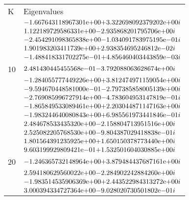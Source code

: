 \begin{figure}[!tbh]
 \centering    
\begin{tabular}{ |p{1cm}|| p{10cm}|}
\hline
 K & Eigenvalues \\ \hhline{|=|=|}   
\hline
5 & ${-1.667643118967301}\mathrm{e}{+00}  {+3.322698092379202}\mathrm{e}{+00i}$\\
  &	${1.122189729586331}\mathrm{e}{+00}   {- 2.935868201795706}\mathrm{e}{+00i}$\\
  &	${-2.454291098365838}\mathrm{e}{+00}  {- 1.034091783975195}\mathrm{e}{-01i}$\\
  &	${1.901983203411739}\mathrm{e}{+00}  {+2.938354695246812}\mathrm{e}{-02i}$\\
  &	${-1.488418331702275}\mathrm{e}{-01}  {+4.856460403443859}\mathrm{e}{-03i}$ \\  
\hline  
10&	${ 2.481430445455568}\mathrm{e}{-01}   {- 3.792088063628674}\mathrm{e}{+00i}$ \\       
  &	${-1.284055777449226}\mathrm{e}{+00}   {+ 3.812474971159054}\mathrm{e}{+00i}$ \\       
  &	${-9.594670448581000}\mathrm{e}{-01}   {- 2.797385858005139}\mathrm{e}{+00i}$ \\       
  &	${-2.769085996727914}\mathrm{e}{+00}   {- 4.783604953147819}\mathrm{e}{-01i}$ \\       
  &	${-1.865849533089461}\mathrm{e}{+00}   {+ 2.203044871147163}\mathrm{e}{+00i}$ \\       
  &	${-1.983244640080843}\mathrm{e}{+00}   {+ 6.985561973441846}\mathrm{e}{-01i}$ \\           
  &	${ 2.484678533435320}\mathrm{e}{+00}   {- 2.158804713951516}\mathrm{e}{+00i}$ \\       
  &	${ 2.525082205768530}\mathrm{e}{+00}   {- 9.804387029418838}\mathrm{e}{-01i}$ \\       
  &	${ 1.801564391235925}\mathrm{e}{+00}   {+ 1.650150378773440}\mathrm{e}{+00i}$ \\       
  &	${ 9.603199929809421}\mathrm{e}{-01}   {+ 1.532501604030885}\mathrm{e}{+00i}$ \\       
\hline  
20&	${-1.246365732148964}\mathrm{e}{+00}   {+ 3.879484437687161}\mathrm{e}{+00i}$ \\       
  &	${ 2.594180629560022}\mathrm{e}{+00}   {- 2.284902242884260}\mathrm{e}{+00i}$ \\       
  &	${-1.983514535906369}\mathrm{e}{+00}   {+ 2.443522984313272}\mathrm{e}{+00i}$ \\       
  &	${ 3.000394334727364}\mathrm{e}{+00}   {- 9.028020730501802}\mathrm{e}{-01i}$ \\       

\end{tabular}
\end{figure}
